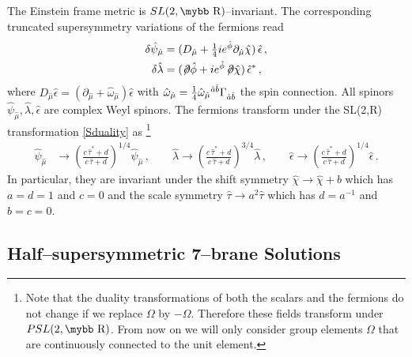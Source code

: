 \documentclass[12pt,a4paper]{article}
\def\bb#1{\hbox{\mybb#1}}
\begin{document}
The Einstein frame metric is $SL(2,\bb{R})$--invariant.
The corresponding truncated supersymmetry variations of the fermions read
\begin{equation}
\begin{aligned}
  \delta \hat{\psi}_{\hat{\mu}}
  & = (D_{\hat{\mu}} + \tfrac{1}{4} i e^{\hat{\phi}}
    \partial_{\hat{\mu}} \hat{\chi} )\, \hat{\epsilon} \,,  \\
  \delta \hat{\lambda} & = (\not \! \partial \hat{\phi}
  + ie^{\hat{\phi}} \! \not \! \partial \hat{\chi} ) \, \hat{\epsilon}^* \,,
\end{aligned}
\label{10DIIBsusy}
\end{equation}
where $D_{\hat{\mu}}\hat\epsilon =
(\partial_{\hat{\mu}}+ \hat{\omega}_{\hat \mu})\hat\epsilon$ with
$\hat{\omega}_{\hat \mu} = {\textstyle{1\over 4}} \hat{\omega}_{\hat{\mu}}{}^{{\hat{a}}
{\hat{b}}} {\Gamma}_{{\hat{a}}{\hat{b}}}$
the spin connection. All spinors
$\hat{\psi}_{\hat{\mu}}, \hat{\lambda}, \hat{\epsilon}$ are
complex Weyl spinors. The fermions transform under the SL(2,\bb{R})
transformation \eqref{Sduality} as \cite{Bergshoeff:1996ui}\footnote{Note that
the duality transformations of both the scalars and the fermions do not
change if we replace $\Omega$ by $-\Omega$. Therefore these
fields transform under $PSL(2,\bb{R})$. From now on we will only
consider group elements $\Omega$ that are continuously connected
to the unit element.}
\begin{align}
  \hat{\psi}_{\hat{\mu}} & \rightarrow \left( \frac{c \, \hat{\tau}^*+d}{c
\, \hat{\tau}+d} \right)^{1/4}
    \hat{\psi}_{\hat{\mu}} \,, \qquad
  \hat{\lambda} \rightarrow \left( \frac{c \, \hat{\tau}^*+d}{c \, \hat{\tau}+d}
\right)^{3/4}
    \hat{\lambda} \,, \qquad
  \hat{\epsilon} \rightarrow \left( \frac{c \, \hat{\tau}^*+d}{c \, \hat{\tau}+d}
 \right)^{1/4}
    \hat{\epsilon} \,.
\label{fermionSduality}
\end{align}
In particular, they are invariant under the shift symmetry
$\hat\chi \rightarrow \hat\chi + b$ which has $a=d=1$ and $c=0$
and the scale symmetry $\hat \tau \rightarrow a^2 \hat \tau$ which has
$d=a^{-1}$ and $b=c=0$.

\subsection{Half--supersymmetric 7--brane Solutions}
\end{document}

